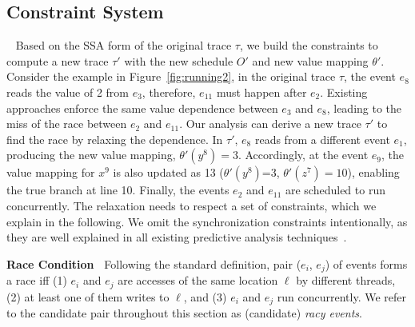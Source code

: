




\subsection{Constraint System}~\label{sec:constraints}
Based on the SSA form of the original trace $\tau$, we build the constraints to compute a new trace $\tau'$ with the new schedule $O'$ and new value mapping $\theta'$.
Consider the example in Figure~\ref{fig:running2}, in the original trace $\tau$, the event $e_8$ reads the value of 2 from $e_3$, therefore, $e_{11}$ must happen after $e_2$. Existing approaches enforce the same value dependence between $e_3$ and $e_8$, leading to the miss of the race between $e_2$ and $e_{11}$.
Our analysis can derive a new trace $\tau'$ to find the race by relaxing the dependence. In $\tau'$, $e_8$ reads from a different event $e_1$, producing the new value mapping, $\theta'(y^8)=3$. Accordingly, at the event $e_9$, the value mapping for $x^9$ is also updated as 13 ($\theta'(y^8)$=3, $\theta'(z^7)=10$), enabling the true branch at line 10. Finally, the events $e_2$ and $e_{11}$ are scheduled to run concurrently.  The relaxation needs to respect a set of constraints, which we explain in the following. We omit the synchronization constraints intentionally, as they are well explained in all existing predictive analysis techniques~\cite{yannis, pldi14}.



{\bf Race Condition\ } Following the standard definition, pair ($e_i$, $e_j$) of events forms a race iff (1) $e_i$ and $e_j$ are accesses of the same location $\ell$ by different threads, (2) at least one of them writes to $\ell$, and (3) $e_i$ and $e_j$ run concurrently. We refer to the candidate pair throughout this section as (candidate) \emph{racy events}.  

